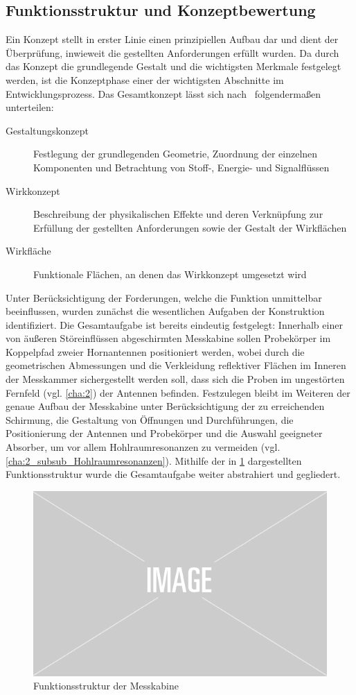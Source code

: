 


\subsection{Funktionsstruktur und Konzeptbewertung}

Ein Konzept stellt in erster Linie einen prinzipiellen Aufbau dar und dient der Überprüfung, inwieweit die gestellten Anforderungen erfüllt wurden. Da durch das Konzept die grundlegende Gestalt und die wichtigsten Merkmale festgelegt werden, ist die Konzeptphase einer der wichtigsten Abschnitte im Entwicklungsprozess. Das Gesamtkonzept lässt sich nach~\cite{Pahl_Beitz_Konstruktionslehre} folgendermaßen unterteilen:

\begin{description}
    \item[Gestaltungskonzept] Festlegung der grundlegenden Geometrie, Zuordnung der einzelnen Komponenten und Betrachtung von Stoff-, Energie- und Signalflüssen
    \item[Wirkkonzept] Beschreibung der physikalischen Effekte und deren Verknüpfung zur Erfüllung der gestellten Anforderungen sowie der Gestalt der Wirkflächen
    \item[Wirkfläche] Funktionale Flächen, an denen das Wirkkonzept umgesetzt wird
\end{description}

Unter Berücksichtigung der Forderungen, welche die Funktion unmittelbar beeinflussen, wurden zunächst die wesentlichen Aufgaben der Konstruktion identifiziert. Die Gesamtaufgabe ist bereits eindeutig festgelegt: Innerhalb einer von äußeren Störeinflüssen abgeschirmten Messkabine sollen Probekörper im Koppelpfad zweier Hornantennen positioniert werden, wobei durch die geometrischen Abmessungen und die Verkleidung reflektiver Flächen im Inneren der Messkammer sichergestellt werden soll, dass sich die Proben im ungestörten Fernfeld (vgl. \Kapitel\ref{cha:2}) der Antennen befinden. Festzulegen bleibt im Weiteren der genaue Aufbau der Messkabine unter Berücksichtigung der zu erreichenden Schirmung, die Gestaltung von Öffnungen und Durchführungen, die Positionierung der Antennen und Probekörper und die Auswahl geeigneter Absorber, um vor allem Hohlraumresonanzen zu vermeiden (vgl. \Abschnitt\ref{cha:2_subsub_Hohlraumresonanzen}). Mithilfe der in \Abb\ref{fig:3_Funktionsstruktur} dargestellten Funktionsstruktur wurde die Gesamtaufgabe weiter abstrahiert und gegliedert.

\begin{figure}[ht]
    \centering
    \includegraphics[width=.6\textwidth]{Abbildungen/placeholder.png}
    \caption{Funktionsstruktur der Messkabine}
    \label{fig:3_Funktionsstruktur}
\end{figure}


